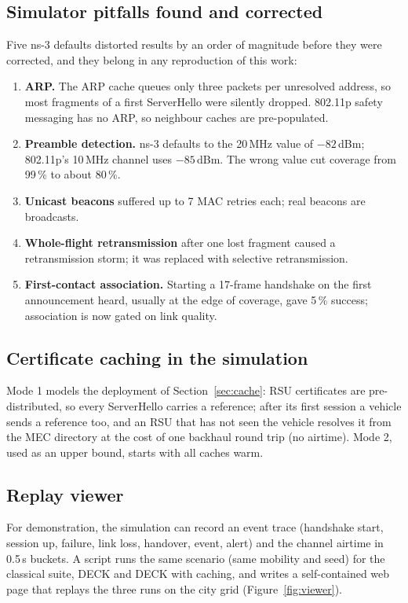 \subsection{Simulator pitfalls found and corrected}

Five ns-3 defaults distorted results by an order of magnitude before they
were corrected, and they belong in any reproduction of this work:
\begin{enumerate}
\item \textbf{ARP.} The ARP cache queues only three packets per unresolved
address, so most fragments of a first ServerHello were silently dropped.
802.11p safety messaging has no ARP, so neighbour caches are pre-populated.
\item \textbf{Preamble detection.} ns-3 defaults to the 20\,MHz value of
$-82$\,dBm; 802.11p's 10\,MHz channel uses $-85$\,dBm. The wrong value cut
coverage from 99\,\% to about 80\,\%.
\item \textbf{Unicast beacons} suffered up to 7 MAC retries each; real beacons
are broadcasts.
\item \textbf{Whole-flight retransmission} after one lost fragment caused a
retransmission storm; it was replaced with selective retransmission.
\item \textbf{First-contact association.} Starting a 17-frame handshake on the
first announcement heard, usually at the edge of coverage, gave 5\,\%
success; association is now gated on link quality.
\end{enumerate}

\subsection{Certificate caching in the simulation}

Mode 1 models the deployment of Section~\ref{sec:cache}: RSU certificates are
pre-distributed, so every ServerHello carries a reference; after its first
session a vehicle sends a reference too, and an RSU that has not seen the
vehicle resolves it from the MEC directory at the cost of one backhaul round
trip (no airtime). Mode 2, used as an upper bound, starts with all caches warm.

\subsection{Replay viewer}

For demonstration, the simulation can record an event trace (handshake
start, session up, failure, link loss, handover, event, alert) and the
channel airtime in 0.5\,s buckets. A script runs the same scenario (same
mobility and seed) for the classical suite, DECK and DECK with caching, and
writes a self-contained web page that replays the three runs on the city grid
(Figure~\ref{fig:viewer}).

